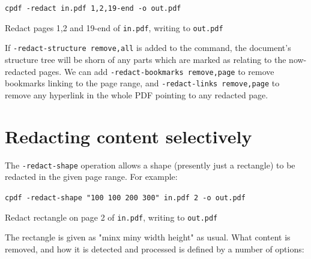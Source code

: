 \documentclass{book}
\begin{document}
  \begin{framed}
    \noindent\small\verb!cpdf -redact in.pdf 1,2,19-end -o out.pdf!
 
    \vspace{2.5mm}
    \noindent Redact pages 1,2 and 19-end of \texttt{in.pdf}, writing to \texttt{out.pdf}
  \end{framed}

\noindent If \texttt{-redact-structure remove,all} is added to the command, the document's structure tree will be shorn of any parts which are marked as relating to the now-redacted pages. We can add \texttt{-redact-bookmarks remove,page} to remove bookmarks linking to the page range, and \texttt{-redact-links remove,page} to remove any hyperlink in the whole PDF pointing to any redacted page.

\section{Redacting content selectively}

The \texttt{-redact-shape} operation allows a shape (presently just a rectangle) to be redacted in the given page range. For example:

  \begin{framed}
    \noindent\small\verb!cpdf -redact-shape "100 100 200 300" in.pdf 2 -o out.pdf!
 
    \vspace{2.5mm}
    \noindent Redact rectangle on page 2 of \texttt{in.pdf}, writing to \texttt{out.pdf}
  \end{framed}

\noindent The rectangle is given as "minx miny width height" as usual. What content is removed, and how it is detected and processed is defined by a number of options:

\medskip

\end{document}
